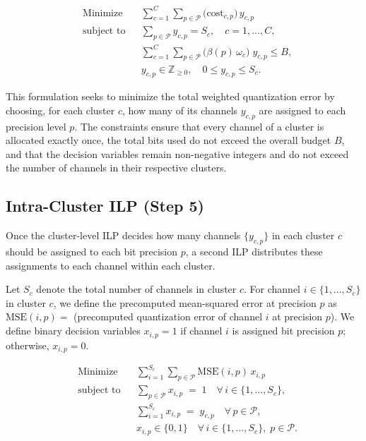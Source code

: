 \begingroup
\[
\begin{aligned}
  &\text{Minimize} 
  && \sum_{c=1}^C \sum_{p \in \mathcal{P}} \bigl(\text{cost}_{c,p}\bigr)\,y_{c,p} \\
  &\text{subject to} 
  && \sum_{p \in \mathcal{P}} y_{c,p} = S_c, \quad c = 1,\dots,C,\\
  &&& \sum_{c=1}^C \sum_{p \in \mathcal{P}} \bigl(\beta(p)\,\omega_c\bigr)\;y_{c,p} 
      \le B,\\
  &&& y_{c,p} \in \mathbb{Z}_{\ge 0}, \quad 0 \le y_{c,p} \le S_c.
\end{aligned}
\]
\endgroup


This formulation seeks to minimize the total weighted quantization error by choosing, for each cluster \(c\), how many of its channels \(y_{c,p}\) are assigned to each precision level \(p\). The constraints ensure that every channel of a cluster is allocated exactly once, the total bits used do not exceed the overall budget \(B\), and that the decision variables remain non-negative integers and do not exceed the number of channels in their respective clusters.


\subsection{Intra-Cluster ILP (Step 5)}
Once the cluster-level ILP decides how many channels \(\{y_{c,p}\}\) in each cluster \(c\) should be assigned to each bit precision \(p\), a second ILP distributes these assignments to each channel within each cluster.

Let \(S_c\) denote the total number of channels in cluster \(c\). For channel \(i \in \{1,\dots,S_c\}\) in cluster \(c\), we define the precomputed mean-squared error at precision \(p\) as
\(\text{MSE}(i,p) = \) (precomputed quantization  error of channel \(i\) at precision \(p\)).
We define binary decision variables \( x_{i,p} = 1 \) if channel \( i \) is assigned bit precision \( p \); otherwise, \( x_{i,p} = 0.\)  



\begingroup
\[
\begin{aligned}
&\text{Minimize} && 
\sum_{i=1}^{S_c} \sum_{p \in \mathcal{P}} \text{MSE}(i,p)\, x_{i,p}
\\
&\text{subject to} &&
\sum_{p \in \mathcal{P}} x_{i,p} \;=\; 1 
\quad \forall\, i \in \{1,\dots,S_c\},
\\
&&& \sum_{i=1}^{S_c} x_{i,p} \;=\; y_{c,p}
\quad \forall\, p \in \mathcal{P},
\\
&&& x_{i,p} \in \{0,1\}
\quad \forall\, i \in \{1,\dots,S_c\},\; p \in \mathcal{P}.
\end{aligned}
\]
\endgroup



